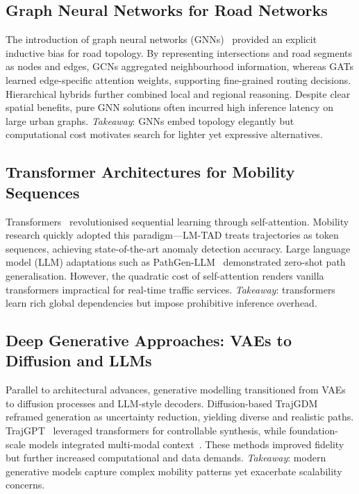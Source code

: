 \subsection{Graph Neural Networks for Road Networks}
\label{sec:lit-gnn}
The introduction of graph neural networks (GNNs)~\cite{kipfSemisupervisedClassificationGraph2017,velickovicGraphAttentionNetworks2018} provided an explicit inductive bias for road topology.  By representing intersections and road segments as nodes and edges, GCNs aggregated neighbourhood information, whereas GATs learned edge-specific attention weights, supporting fine-grained routing decisions.  Hierarchical hybrids further combined local and regional reasoning.  Despite clear spatial benefits, pure GNN solutions often incurred high inference latency on large urban graphs.  \textit{Takeaway}: GNNs embed topology elegantly but computational cost motivates search for lighter yet expressive alternatives.

\subsection{Transformer Architectures for Mobility Sequences}
\label{sec:lit-transformer}
Transformers~\cite{vaswaniAttentionAllYou2023} revolutionised sequential learning through self-attention.  Mobility research quickly adopted this paradigm—LM-TAD treats trajectories as token sequences, achieving state-of-the-art anomaly detection accuracy.  Large language model (LLM) adaptations such as PathGen-LLM~\cite{liPathGenLLMLargeLanguage} demonstrated zero-shot path generalisation.  However, the quadratic cost of self-attention renders vanilla transformers impractical for real-time traffic services.  \textit{Takeaway}: transformers learn rich global dependencies but impose prohibitive inference overhead.

\subsection{Deep Generative Approaches: VAEs to Diffusion and LLMs}
\label{sec:lit-generative}
Parallel to architectural advances, generative modelling transitioned from VAEs to diffusion processes and LLM-style decoders.  Diffusion-based TrajGDM~\cite{chuSimulatingHumanMobility2024} reframed generation as uncertainty reduction, yielding diverse and realistic paths.  TrajGPT~\cite{hsuTrajGPTControlledSynthetic2024} leveraged transformers for controllable synthesis, while foundation-scale models integrated multi-modal context~\cite{maLearningUniversalHuman2025}.  These methods improved fidelity but further increased computational and data demands.  \textit{Takeaway}: modern generative models capture complex mobility patterns yet exacerbate scalability concerns.


